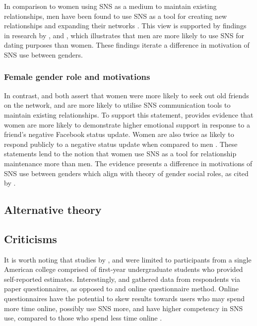 In comparison to women using SNS as a medium to maintain existing relationships, men have been found to use SNS as a tool for creating new relationships and expanding their networks \citep{Mazman2011}. This view is supported by findings in research by \citet{Muscanell2012}, \citet{Raacke2008} and \citet{Haferkamp2012}, which illustrates that men are more likely to use SNS for dating purposes than women. These findings iterate a difference in motivation of SNS use between genders. 

\subsubsection{Female gender role and motivations}

In contrast, \citet{Mazman2011} and \citet{Muscanell2012} both assert that women were more likely to seek out old friends on the network, and are more likely to utilise SNS communication tools to maintain existing relationships. To support this statement, \citet{Joiner2014} provides evidence that women are more likely to demonstrate higher emotional support in response to a friend's negative Facebook status update. Women are also twice as likely to respond publicly to a negative status update when compared to men \citep[p. 167]{Joiner2014}. These statements lend to the notion that women use SNS as a tool for relationship maintenance more than men. The evidence presents a difference in motivations of SNS use between genders which align with  theory of gender social roles, as cited by \citet{Kimbrough2013}.

\subsection{Alternative theory}

\subsection{Criticisms}

It is worth noting that studies by \citet{Raacke2008}, \citet{Muscanell2012} and \citet{Joiner2014} were limited to participants from a single American college comprised of first-year undergraduate students who provided self-reported estimates. Interestingly, \citet{Raacke2008} and \citet{Joiner2014} gathered data from respondents via paper questionnaires, as opposed to  and  online questionnaire method. Online questionnaires have the potential to skew results towards users who may spend more time online, possibly use SNS more, and have higher competency in SNS use, compared to those who spend less time online \citep[p. 280]{Hargittai2007}.

